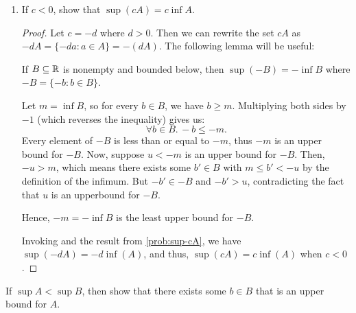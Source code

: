 \begin{problem}
\begin{enumerate}[label=(\alph*)]
\begin{proof}
        Next, consider the case when $c = 0$. Then, $cA = \{0\}$, and thus $\sup(cA) = b = 0 = cs$. 

        In either case, we conclude that $cs$ is indeed the least upper bound for $cA$.
      \end{proof}

    \item If $c < 0$, show that $\sup(cA) = c \inf A$. \label{prob:sup-cA-negative}

      \begin{proof}

        Let $c = -d$ where $d > 0$. Then we can rewrite the set $cA$ as $-dA = \{-da : a \in A\} = -(dA)$. 
        The following lemma will be useful:

        \begin{lemma}\label{lem:sup-neg-bounded}
          If $B \subseteq \mathbb{R}$ is nonempty and bounded below, then $\sup(-B) = -\inf B$ 
          where $-B = \{-b : b \in B\}$.
        \end{lemma}

        \begin{subproof}
          Let $m = \inf B$, so for every $b \in B$, we have $b \geq m$.
          Multiplying both sides by $-1$ (which reverses the
          inequality) gives us:
          \[
            \forall b \in B.\, -b \leq -m.
          \]
          Every element of $-B$ is less than or equal to $-m$, thus $-m$ is
          an upper bound for $-B$. Now, suppose $u < -m$ is an upper bound for
          $-B$. Then,  $-u > m$, which means there exists some $b' \in B$ with
          $m \leq b' < -u$ by the definition of the infimum.
          But $-b' \in -B$ and $-b' > u$, contradicting the fact that $u$ is an upperbound for $-B$.

          Hence, $-m = -\inf B$ is the least upper bound for $-B$. 
        \end{subproof}

        Invoking  and the result from \ref{prob:sup-cA},
        we have $\sup(-dA) = -d \inf(A)$, and thus, $\sup(cA) = c \inf(A)$ when
        $c < 0$. 

      \end{proof}

  \end{enumerate}
\end{problem}

\begin{problem} \label{prob:sup-upper-bound}
  If $\sup A < \sup B$, then show that there exists some $b \in B$ that is an upper bound for $A$.
\end{problem}

